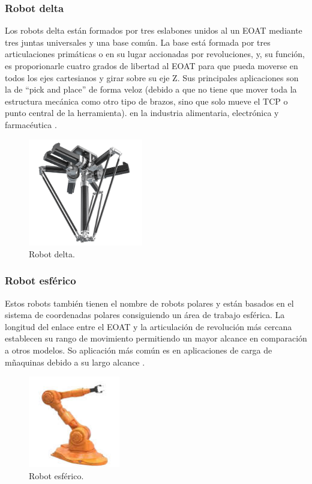 \subsubsection{Robot delta}
Los robots delta están formados por tres eslabones unidos al un EOAT mediante tres juntas universales y una base común. La base está formada por tres articulaciones primáticas o en su lugar accionadas por revoluciones, y, su función, es proporionarle cuatro grados de libertad al EOAT para que pueda moverse en todos los ejes cartesianos y girar sobre su eje Z. Sus principales aplicaciones son la de ``pick and place'' de forma veloz (debido a que no tiene que mover toda la estructura mecánica como otro tipo de brazos, sino que solo mueve el TCP o punto central de la herramienta). en la industria alimentaria, electrónica y farmacéutica \cite{tipos_robots_2}.


\begin{figure} [h!]
  \begin{center}
    \includegraphics[width=5cm]{figs/robot_delta}
  \end{center}
  \caption{\centering Robot delta.}
  \label{fig:robot_delta}
\end{figure} 

\subsubsection{Robot esférico}

Estos robots también tienen el nombre de robots polares y están basados en el sistema de coordenadas polares consiguiendo un área de trabajo esférica. La longitud del enlace entre el EOAT y la articulación de revolución más cercana establecen su rango de movimiento permitiendo un mayor alcance en comparación a otros modelos. So aplicación más común es en aplicaciones de carga de mñaquinas debido a su largo alcance \cite{tipos_robots_2}.

\begin{figure} [h!]
  \begin{center}
    \includegraphics[width=4cm]{figs/robot_esferico}
  \end{center}
  \caption{\centering Robot esférico.}
  \label{fig:robot_esferico}
\end{figure} 

